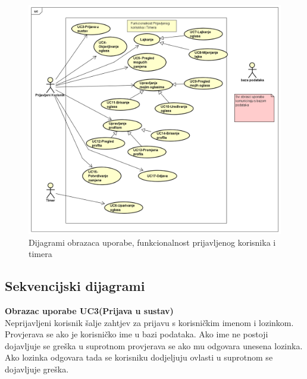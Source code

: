 \begin{figure}[H]
	\includegraphics[scale=0.4]{dijagrami/dijagram2.PNG} %
	\centering
	\caption{Dijagrami obrazaca uporabe, funkcionalnost prijavljenog korisnika i timera}
	\label{fig:dijagramObrazaca2}
\end{figure}

\eject

\subsection{Sekvencijski dijagrami}

\noindent \textbf{Obrazac uporabe UC3(Prijava u sustav)}\\
	\indent Neprijavljeni korisnik šalje zahtjev za prijavu s korisničkim imenom i lozinkom. Provjerava se ako je korisničko ime u bazi podataka. Ako ime ne postoji dojavljuje se greška u suprotnom provjerava se ako mu odgovara unesena lozinka. Ako lozinka odgovara tada se korisniku dodjeljuju ovlasti u suprotnom se dojavljuje greška.


